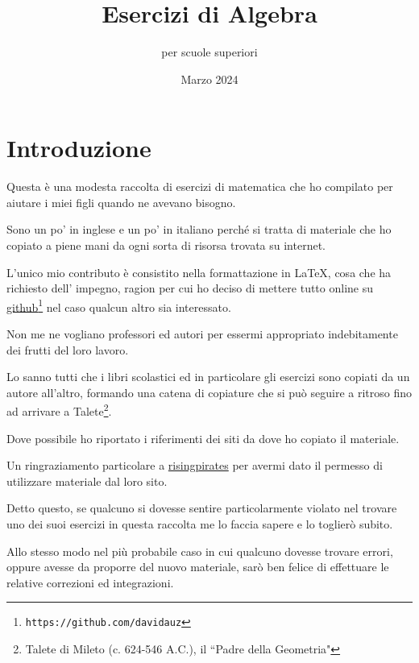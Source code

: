 \documentclass[a4paper,14pt]{extarticle}
\title{Esercizi di Algebra}
\author{per scuole superiori}
\date{Marzo 2024}
\begin{document}
\maketitle
\tableofcontents
\newpage

\section{Introduzione}

Questa è una modesta raccolta di esercizi di matematica che ho 
compilato per aiutare i miei figli quando ne avevano bisogno.

Sono un po' in inglese e un po' in italiano perché
si tratta di materiale che ho copiato a piene mani da ogni 
sorta di risorsa trovata su internet.

L'unico mio contributo è consistito nella formattazione in  \LaTeX, cosa che ha richiesto 
dell' impegno, ragion per cui ho deciso di mettere tutto online su \href{https://github.com/davidauz}{github}\footnote{\texttt{https://github.com/davidauz}}
nel caso qualcun altro sia interessato.

Non me ne vogliano professori ed autori per essermi appropriato indebitamente dei frutti del loro lavoro.

Lo sanno tutti che i libri scolastici ed in particolare gli esercizi sono copiati da un autore 
all'altro, formando una catena di copiature che si può seguire a ritroso fino ad arrivare a 
Talete\footnote{Talete di Mileto (c. 624-546 A.C.), il ``Padre della Geometria"}.

Dove possibile ho riportato i riferimenti dei siti da dove ho copiato il materiale.

Un ringraziamento particolare a \href{https://www.risingpirates.com}{risingpirates} per avermi dato il permesso di
utilizzare materiale dal loro sito.

Detto questo, se qualcuno si dovesse sentire particolarmente violato nel trovare uno dei 
suoi esercizi in questa raccolta me lo faccia sapere e lo toglierò subito.

Allo stesso modo nel più probabile caso in cui qualcuno dovesse trovare errori, oppure avesse da 
proporre del nuovo materiale, sarò ben felice di effettuare le relative correzioni ed integrazioni.


















\end{document}
